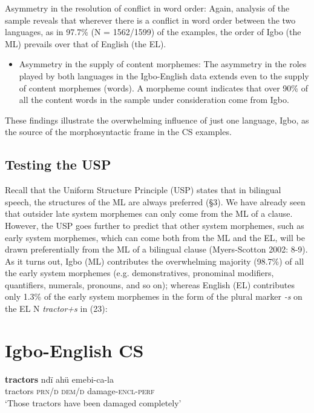 \documentclass[output=paper]{langsci/langscibook}
\begin{document}
\begin{stylelsBulletList}
Asymmetry in the resolution of conflict in word order: Again, analysis of the sample reveals that wherever there is a conflict in word order between the two languages, as in 97.7\% (N = 1562/1599) of the examples, the order of Igbo (the ML) prevails over that of English (the EL). 
\end{stylelsBulletList}

\begin{itemize}
\item \begin{styleListParagraph}
Asymmetry in the supply of content morphemes: The asymmetry in the roles played by both languages in the Igbo-English data extends even to the supply of content morphemes (words). A morpheme count indicates that over 90\% of all the content words in the sample under consideration come from Igbo.
\end{styleListParagraph}\end{itemize}

These findings illustrate the overwhelming influence of just one language, Igbo, as the source of the morphosyntactic frame in the CS examples. 

\section{ Testing the USP}

Recall that the Uniform Structure Principle (USP) states that in bilingual speech, the structures of the ML are always preferred (§3). We have already seen that outsider late system morphemes can only come from the ML of a clause. However, the USP goes further to predict that other system morphemes, such as early system morphemes, which can come both from the ML and the EL, will be drawn preferentially from the ML of a bilingual clause (Myers-Scotton 2002: 8-9). As it turns out, Igbo (ML) contributes the overwhelming majority (98.7\%) of all the early system morphemes (e.g. demonstratives, pronominal modifiers, quantifiers, numerals, pronouns, and so on); whereas English (EL) contributes only 1.3\% of the early system morphemes in the form of the plural marker \textit{{}-s} on the EL N \textit{tractor+s }in (23): 

\chapter{Igbo-English CS}
\gll \textbf{tractors  }ndï    ahü  emebi-ca-la\\
     tractors  \textsc{prn/d}\textsubscript{    }\textsc{dem/d}  damage-\textsc{encl-perf}\textsubscript{ }\\
\glt ‘Those tractors have been damaged completely’
\z
\end{document}
